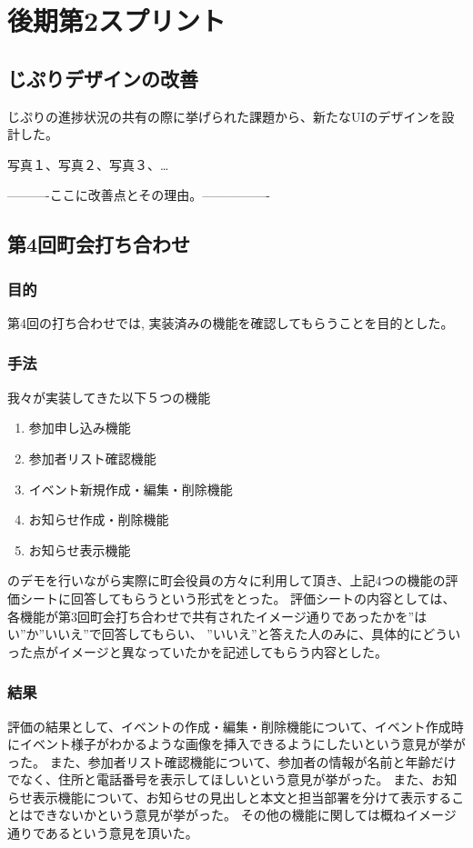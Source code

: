 \section{後期第2スプリント}
\subsection{じぷりデザインの改善}
じぷりの進捗状況の共有の際に挙げられた課題から、新たなUIのデザインを設計した。

写真１、写真２、写真３、…

----------ここに改善点とその理由。----------------

\subsection{第4回町会打ち合わせ}
\subsubsection{目的}
第4回の打ち合わせでは, 実装済みの機能を確認してもらうことを目的とした。
\subsubsection{手法}
我々が実装してきた以下５つの機能
\begin{enumerate}
    \item 参加申し込み機能
    \item 参加者リスト確認機能
    \item イベント新規作成・編集・削除機能
    \item お知らせ作成・削除機能
    \item お知らせ表示機能
\end{enumerate}
のデモを行いながら実際に町会役員の方々に利用して頂き、上記4つの機能の評価シートに回答してもらうという形式をとった。
評価シートの内容としては、各機能が第3回町会打ち合わせで共有されたイメージ通りであったかを”はい”か”いいえ”で回答してもらい、
”いいえ”と答えた人のみに、具体的にどういった点がイメージと異なっていたかを記述してもらう内容とした。
\subsubsection{結果}
評価の結果として、イベントの作成・編集・削除機能について、イベント作成時にイベント様子がわかるような画像を挿入できるようにしたいという意見が挙がった。
また、参加者リスト確認機能について、参加者の情報が名前と年齢だけでなく、住所と電話番号を表示してほしいという意見が挙がった。
また、お知らせ表示機能について、お知らせの見出しと本文と担当部署を分けて表示することはできないかという意見が挙がった。
その他の機能に関しては概ねイメージ通りであるという意見を頂いた。
